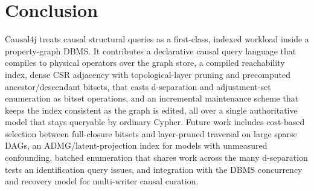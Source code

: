 \section{Conclusion}\label{sec:concl}

Causal4j treats causal structural queries as a first-class, indexed workload
inside a property-graph DBMS. It contributes a declarative causal query language
that compiles to physical operators over the graph store, a compiled reachability
index, dense CSR adjacency with topological-layer pruning and precomputed
ancestor/descendant bitsets, that casts d-separation and adjustment-set
enumeration as bitset operations, and an incremental maintenance scheme that keeps
the index consistent as the graph is edited, all over a single authoritative
model that stays queryable by ordinary Cypher. Future work includes cost-based
selection between full-closure bitsets and layer-pruned traversal on large sparse
DAGs, an ADMG/latent-projection index for models with unmeasured confounding,
batched enumeration that shares work across the many d-separation tests an
identification query issues, and integration with the DBMS concurrency and
recovery model for multi-writer causal curation.
